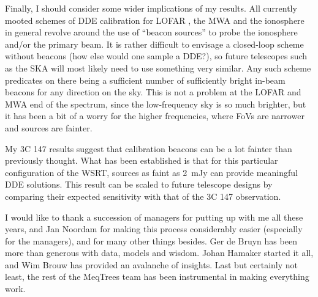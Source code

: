 \documentclass{aa}
\begin{document}
Finally, I should consider some wider implications of my results. All currently mooted schemes of DDE calibration for LOFAR \citep{JEN:LOFAR3}, the MWA \citep{Mitchell:MWA-cal} and the ionosphere in general \citep{Intema:SPAM,Cotton:FBC} revolve around the use of ``beacon sources'' to probe the ionosphere and/or the primary beam. It is rather difficult to envisage a closed-loop scheme without beacons (how else would one sample a DDE?), so future telescopes such as the SKA will most likely need to use something very similar. Any such scheme predicates on there being a sufficient number of sufficiently bright in-beam beacons for any direction on the sky. This is not a problem at the LOFAR and MWA end of the spectrum, since the low-frequency sky is so much brighter, but it has been a bit of a worry for the higher frequencies, where FoVs are narrower and sources are fainter.

My 3C 147 results suggest that calibration beacons can be a lot fainter than previously thought. What has been established is that for this particular configuration of the WSRT, sources as faint as 2~mJy can provide meaningful DDE solutions. This result can be scaled to future telescope designs by comparing their expected sensitivity with that of the 3C 147 observation.

\begin{acknowledgements}

I would like to thank a succession of managers for putting up with me all these years, and Jan Noordam for 
making this process considerably easier (especially for the managers), and for many other things besides. Ger de Bruyn has been more than generous with data, models and wisdom. Johan Hamaker started it all, and Wim Brouw has provided an avalanche of insights. Last but certainly not least, the rest of the MeqTrees team has been instrumental in making everything work.

\end{acknowledgements}




\end{document}
